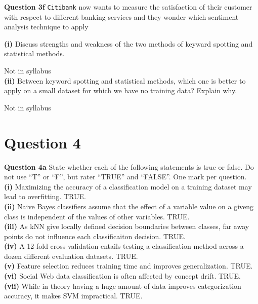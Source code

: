 \documentclass[11pt,a4paper]{report}
\begin{document}
\begin{multicols*}{2}
\noindent \textbf{Question 3f} \verb|Citibank| now wants to measure the satisfaction of their customer with respect to different banking services and they wonder which sentiment analysis technique to apply

\noindent \textbf{(i)} Discuss strengths and weakness of the two methods of keyward spotting and statistical methods. 

\noindent Not in syllabus\\

\noindent \textbf{(ii)} Between keyword spotting and statistical methods, which one is better to apply on a small dataset for which we have no training data? Explain why.

\noindent Not in syllabus

\section{Question 4}

\noindent \textbf{Question 4a} State whether each of the following statements is true or false. Do not use ``T'' or ``F'', but rater ``TRUE'' and ``FALSE''. One mark per question.\\

\noindent \textbf{(i)} Maximizing the accuracy of a classification model on a training dataset may lead to overfitting. TRUE.\\

\noindent \textbf{(ii)} Naive Bayes classifiers assume that the effect of a variable value on a giveng class is independent of the values of other variables. TRUE.\\

\noindent \textbf{(iii)} As kNN give locally defined decision boundaries between classes, far away points do not influence each classificaiton decision. TRUE.\\

\noindent \textbf{(iv)} A 12-fold cross-validation entails testing a classification method across a dozen different evaluation datasets. TRUE.\\

\noindent \textbf{(v)} Feature selection reduces training time and improves generalization. TRUE.\\

\noindent \textbf{(vi)} Social Web data classification is often affected by concept drift. TRUE.\\

\noindent \textbf{(vii)} While in theory having a huge amount of data improves categorization accuracy, it makes SVM impractical. TRUE.\\


\end{multicols*}
\end{document}
